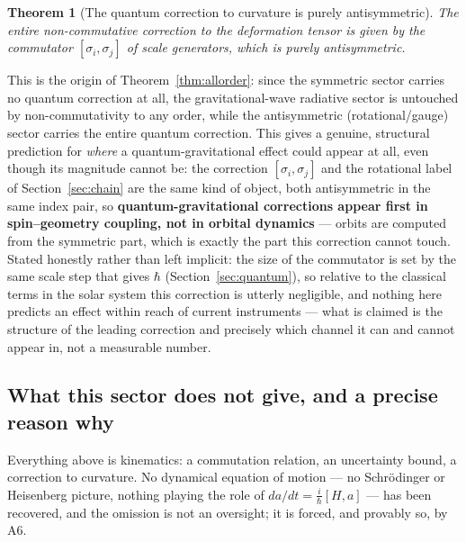 \documentclass[aps,prd,twocolumn,superscriptaddress,nofootinbib]{revtex4-2}
\newtheorem{theorem}{Theorem}
\begin{document}
\begin{theorem}[The quantum correction to curvature is purely antisymmetric]\label{thm:ncconf}
The entire non-commutative correction to the deformation tensor is given
by the commutator $[\sigma_i,\sigma_j]$ of scale generators, which is
purely antisymmetric.
\end{theorem}

This is the origin of Theorem~\ref{thm:allorder}: since the symmetric
sector carries no quantum correction at all, the gravitational-wave
radiative sector is untouched by non-commutativity to any order, while
the antisymmetric (rotational/gauge) sector carries the entire quantum
correction. This gives a genuine, structural prediction for \emph{where}
a quantum-gravitational effect could appear at all, even though its
magnitude cannot be: the correction $[\sigma_i,\sigma_j]$ and the
rotational label of Section~\ref{sec:chain} are the same kind of
object, both antisymmetric in the same index pair, so
\textbf{quantum-gravitational corrections appear first in
spin–geometry coupling, not in orbital dynamics} — orbits are computed
from the symmetric part, which is exactly the part this correction
cannot touch. Stated honestly rather than left implicit: the size of
the commutator is set by the same scale step that gives $\hbar$
(Section~\ref{sec:quantum}), so relative to the classical terms in the
solar system this correction is utterly negligible, and nothing here
predicts an effect within reach of current instruments — what is
claimed is the structure of the leading correction and precisely which
channel it can and cannot appear in, not a measurable number.

\subsection{What this sector does not give, and a precise reason why}\label{ss:nodynamics}

Everything above is kinematics: a commutation relation, an uncertainty
bound, a correction to curvature. No dynamical equation of motion — no
Schrödinger or Heisenberg picture, nothing playing the role of
$da/dt=\tfrac{i}{\hbar}[H,a]$ — has been recovered, and the omission is
not an oversight; it is forced, and provably so, by A6.
\end{document}
